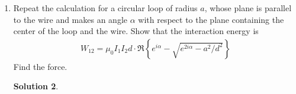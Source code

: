 \documentclass[letter,12pt]{article}
\theoremstyle{definition}
\newtheorem*{sol}{Solution}
\begin{document}
\begin{enumerate}
\begin{enumerate}
\begin{sol}
\begin{align*}
                        \\
                        &=
                        \frac{-d \sin \alpha}
                        {{(x - d \cos \alpha)}^2 + {(d \sin \alpha)}^2}
                        \\
                        B_z(x, 0) &= \frac{\partial A_y}{\partial x} \biggr \vert_{z=0}
                        \\
                        &=
                        \frac{x-d \sin \alpha}
                        {{(x - d \cos \alpha)}^2 + {(d \sin \alpha)}^2}
                    \end{align*}
                    \begin{align*}
                        F_x &= I_1
                        \left[
                            B_z\left(\frac{b}{2}, 0\right) - B_z\left(-\frac{b}{2}, 0\right)
                        \right]
                        \\
                        &=
                        \frac{2 \mu_0 I_1 I_2 a b}{\pi}
                        \frac{4d^2 \cos(2\alpha) - b^2}
                        {b^4 - 8d^2\cos(2\alpha)b^2 + 16d^4}
                        \\
                        F_z &= - I_2
                        \left[
                            B_x\left(\frac{b}{2}, 0\right) - B_x\left(-\frac{b}{2}, 0\right)
                        \right]
                        \\
                        &=
                        \frac{8 \mu_0 I_1 I_2 a b}{\pi}
                        \frac{d^2 \sin(2\alpha)}
                        {b^4 - 8d^2\cos(2\alpha)b^2 + 16d^4}
                    \end{align*}
                \end{sol}
            \item
                Repeat the calculation for a circular loop of radius
                $a$, whose plane is parallel to the wire and makes an
                angle $\alpha$ with respect to the plane containing
                the center of the loop and the wire. Show that the
                interaction energy is
                \begin{align*}
                    W_{12} = \mu_0 I_1 I_2 d \cdot \Re
                    \left\{
                        e^{i\alpha} - \sqrt{e^{2i\alpha} - a^2 / d^2}
                    \right\}
                \end{align*}
                Find the force.
                \begin{sol}

\end{sol}
\end{enumerate}
\end{enumerate}
\end{document}
